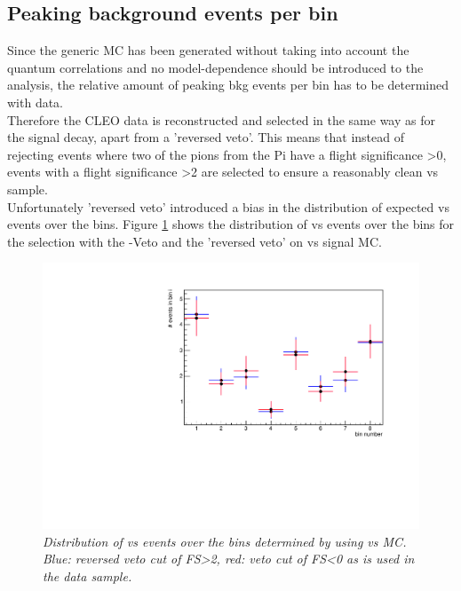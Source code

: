\subsection{Peaking background events per bin}
\label{sec:peak}
Since the generic MC has been generated without taking into account the quantum correlations and no model-dependence should be introduced to the analysis, the relative amount of peaking bkg events per bin has to be determined with data.\\
Therefore the CLEO data is reconstructed and selected in the same way as for the signal decay, apart from a 'reversed \KS veto'. This means that instead of rejecting events where two of the pions from the \4Pi have a \KS flight significance >0, events with a \KS flight significance >2 are selected to ensure a reasonably clean \KsPiPi vs \KsPiPi sample.\\
Unfortunately 'reversed \KS veto' introduced a bias in the distribution of expected \KsPiPi vs \KsPiPi events over the bins. Figure \ref{fig:selbias} shows the distribution of \KsPiPi vs \KsPiPi events over the bins for the selection with the \KS-Veto and the 'reversed \KS veto' on \KsPiPi vs \KsPiPi signal MC.\\
\newpage
\begin{figure}[!h]
	\vspace*{-0.cm}
	\begin{center}
		\includegraphics[width=1.\textwidth]{KsPiPi_selbias.pdf}
		\vspace*{-1.5cm}
	\end{center}
	\caption{\textit{Distribution of \KsPiPi vs \KsPiPi events over the bins determined by using \KsPiPi vs \KsPiPi MC. Blue: reversed \KS veto cut of FS>2, red: \KS veto cut of FS<0 as is used in the data sample.}}
	\label{fig:selbias}
\end{figure}
